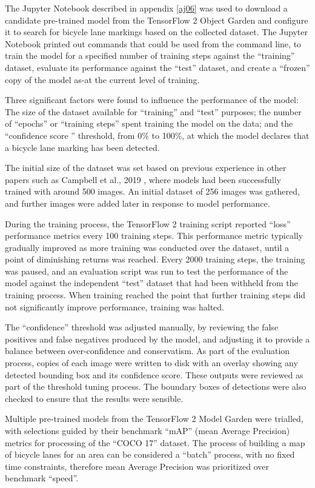 \documentclass[11pt,twoside]{report}
\begin{document}
The Jupyter Notebook described in appendix \ref{aj06} was used to download a candidate pre-trained model from the TensorFlow 2 Object Garden and configure it to search for bicycle lane markings based on the collected dataset.  The Jupyter Notebook printed out commands that could be used from the command line, to train the model for a specified number of training steps against the ``training'' dataset, evaluate its performance against the ``test'' dataset, and create a ``frozen'' copy of the model as-at the current level of training.

Three significant factors were found to influence the performance of the model:  The size of the dataset available for ``training'' and ``test'' purposes; the number of ``epochs'' or ``training steps'' spent training the model on the data; and the ``confidence score '' threshold, from 0\% to 100\%, at which the model declares that a bicycle lane marking has been detected.

The initial size of the dataset was set based on previous experience in other papers such as Campbell et al., 2019 \cite{CAMPBELL2019101350}, where models had been successfully trained with around 500 images.  An initial dataset of 256 images was gathered, and further images were added later in response to model performance.

During the training process, the TensorFlow 2 training script reported ``loss'' performance metrics every 100 training steps.  This performance metric typically gradually improved as more training was conducted over the dataset, until a point of diminishing returns was reached.  Every 2000 training steps, the training was paused, and an evaluation script was run to test the performance of the model against the independent ``test'' dataset that had been withheld from the training process.  When training reached the point that further training steps did not significantly improve performance, training was halted.

The ``confidence'' threshold was adjusted manually, by reviewing the false positives and false negatives produced by the model, and adjusting it to provide a balance between over-confidence and conservatism.  As part of the evaluation process, copies of each image were written to disk with an overlay showing any detected bounding box and its confidence score.  These outputs were reviewed as part of the threshold tuning process.  The boundary boxes of detections were also checked to ensure that the results were sensible.

Multiple pre-trained models from the TensorFlow 2 Model Garden were trialled, with selections guided by their benchmark ``mAP'' (mean Average Precision) metrics for processing of the ``COCO 17'' dataset.  The process of building a map of bicycle lanes for an area can be considered a ``batch'' process, with no fixed time constraints, therefore mean Average Precision was prioritized over benchmark ``speed''.
\end{document}
